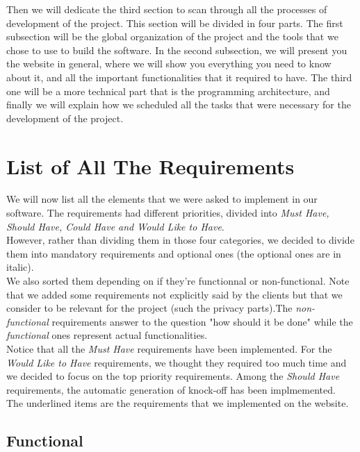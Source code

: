 \documentclass[a4paper, 12pt]{article}
\begin{document}
Then we will dedicate the third section to scan through all the processes of development of the project. This section will be divided in four parts. The first subsection will be the global organization of the project and the tools that we chose to use to build the software. In the second subsection, we will present you the website in general, where we will show you everything you need to know about it, and all the important functionalities that it required to have. The third one will be a more technical part that is the programming architecture, and finally we will explain how we scheduled all the tasks that were necessary for the development of the project.\\

\newpage
\section{List of All The Requirements}
We will now list all the elements that we were asked to implement in our software. The requirements had different priorities, divided into \textit{Must Have, Should Have, Could Have and Would Like to Have}. \\

However, rather than dividing them in those four categories, we decided to divide them into mandatory requirements and optional ones (the optional ones are in italic). \\

We also sorted  them depending on if they're functionnal or non-functional. Note that we added some requirements not explicitly said by the clients but that we consider to be relevant for the project (such the privacy parts).The \textit{non-functional} requirements answer to the question "how should it be done" while the \textit{functional} ones represent actual functionalities.\\

Notice that all the \textit{Must Have} requirements have been implemented. For the \textit{Would Like to Have} requirements, we thought they required too much time and we decided to focus on the top priority requirements. Among the \textit{Should Have} requirements, the automatic generation of knock-off has been implmemented.\\

The underlined items are the requirements that we implemented on the website.
\subsection*{Functional}
\end{document}
